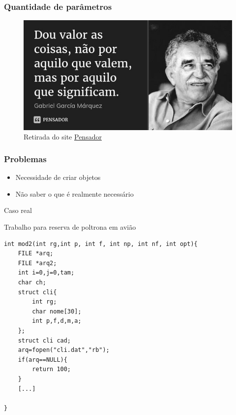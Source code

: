 \begin{frame}
	\frametitle{Quantidade de parâmetros}

	\begin{figure}[h]
		\centering
			\includegraphics[height=0.6\paperheight]{figuras/gabriel}
		\caption{Retirada do site \href{https://www.pensador.com/frase/MjE5MzQ4/}{Pensador}}\label{figure:gabriel}
	\end{figure}

\end{frame}

\begin{frame}
	\frametitle{Problemas}

	\begin{itemize}
		\item Necessidade de criar objetos
		\item Não saber o que é realmente necessário
	\end{itemize}

\end{frame}

\begin{frame}
	\Huge Caso real
\end{frame}

\begin{frame}[fragile]

	\begin{listing}[H]
		\caption{Trabalho para reserva de poltrona em avião}
		\begin{verbatim}
int mod2(int rg,int p, int f, int np, int nf, int opt){
	FILE *arq;
	FILE *arq2;
	int i=0,j=0,tam;
	char ch;
	struct cli{
		int rg;
		char nome[30];
		int p,f,d,m,a;
	};
	struct cli cad;
	arq=fopen("cli.dat","rb");
	if(arq==NULL){
		return 100;
	}
	[...]

}
		\end{verbatim}
	\end{listing}

\end{frame}


